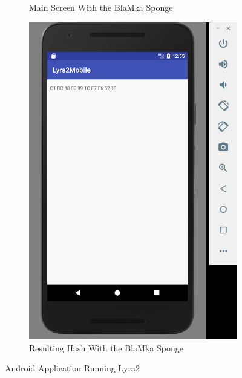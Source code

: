 \begin{figure}[H]
\begin{subfigure}{.5\textwidth}
  \caption{Main Screen With the BlaMka Sponge}
  \label{fig:lyra2-mobile-main-blamka}
\end{subfigure}%
\begin{subfigure}{.5\textwidth}
  \centering
  \includegraphics[width=.8\linewidth]{figures/lyra2-mobile-result-blamka-clean}
  \caption{Resulting Hash With the BlaMka Sponge}
  \label{fig:lyra2-mobile-result-blamka}
\end{subfigure}
\caption{Android Application Running Lyra2}
\label{fig:lyra2-mobile-demo}
\end{figure}
